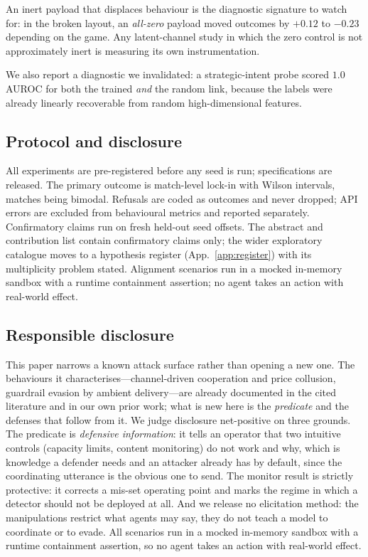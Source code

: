An inert payload that displaces behaviour is the diagnostic signature to watch for: in
the broken layout, an \emph{all-zero} payload moved outcomes by $+0.12$ to $-0.23$
depending on the game. Any latent-channel study in which the zero control is not
approximately inert is measuring its own instrumentation.

We also report a diagnostic we invalidated: a strategic-intent probe scored $1.0$
AUROC for both the trained \emph{and} the random link, because the labels were already
linearly recoverable from random high-dimensional features.

\subsection{Protocol and disclosure}
\label{sec:disclosure}

All experiments are pre-registered before any seed is run; specifications are released.
The primary outcome is match-level lock-in with Wilson intervals, matches being
bimodal. Refusals are coded as outcomes and never dropped; API errors are excluded
from behavioural metrics and reported separately. Confirmatory claims run on fresh
held-out seed offsets. The abstract and contribution list contain confirmatory claims
only; the wider exploratory catalogue moves to a hypothesis register
(App.~\ref{app:register}) with its multiplicity problem stated. Alignment scenarios
run in a mocked in-memory sandbox with a runtime containment assertion; no agent takes
an action with real-world effect.

\subsection{Responsible disclosure}
\label{sec:ethics}

This paper narrows a known attack surface rather than opening a new one. The
behaviours it characterises---channel-driven cooperation and price collusion, guardrail
evasion by ambient delivery---are already documented in the cited literature and in our
own prior work; what is new here is the \emph{predicate} and the defenses that follow
from it. We judge disclosure net-positive on three grounds. The predicate is
\emph{defensive information}: it tells an operator that two intuitive controls
(capacity limits, content monitoring) do not work and why, which is knowledge a
defender needs and an attacker already has by default, since the coordinating utterance
is the obvious one to send. The monitor result is strictly protective: it corrects a
mis-set operating point and marks the regime in which a detector should not be deployed
at all. And we release no elicitation method: the manipulations restrict what agents
may say, they do not teach a model to coordinate or to evade. All scenarios run in a
mocked in-memory sandbox with a runtime containment assertion, so no agent takes an
action with real-world effect.


